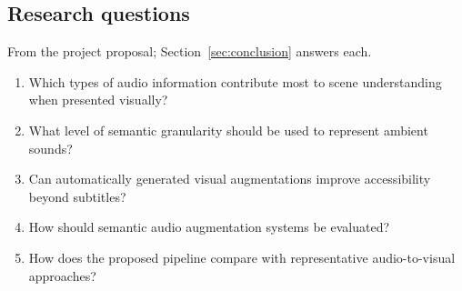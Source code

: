 \subsection{Research questions}\label{sec:rqs}
From the project proposal; Section~\ref{sec:conclusion} answers each.
\begin{enumerate}[label=RQ\arabic*.]
  \item Which types of audio information contribute most to scene understanding when presented visually?
  \item What level of semantic granularity should be used to represent ambient sounds?
  \item Can automatically generated visual augmentations improve accessibility beyond subtitles?
  \item How should semantic audio augmentation systems be evaluated?
  \item How does the proposed pipeline compare with representative audio-to-visual approaches?
\end{enumerate}

